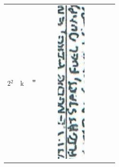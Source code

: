 \documentclass[10pt]{article}
\begin{document}
\begin{center}
\begin{tabular}{|c|c|c|c|c|c|c|c|c|c|}
 &  &  &  \\
\hline
\(2{ }^{2}\) & k & ＂ &  &  & \includegraphics[max width=\textwidth]{2025_02_27_dd68c3d38de88f0516d9g-096(6)}

\end{tabular}
\end{center}
\end{document}
